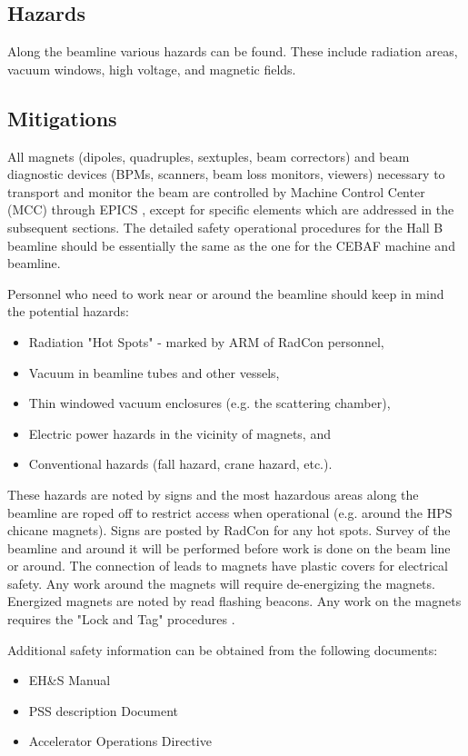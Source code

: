 \documentclass[11pt]{report}
\begin{document}
\subsection{Hazards} 

Along the beamline various hazards can be found. These include radiation areas, vacuum windows, high voltage, and magnetic fields.

\subsection{Mitigations}

\indent

All magnets (dipoles, quadruples, sextuples, beam correctors) and beam diagnostic devices (BPMs, scanners, beam loss monitors, viewers) necessary to transport and monitor the beam are controlled by Machine Control Center (MCC) through EPICS \cite{epics}, except for specific elements which are addressed in the subsequent sections. The detailed safety operational procedures for the Hall B beamline should be essentially the same as the one for the CEBAF machine and beamline.

Personnel who need to work near or around the beamline should keep in mind the potential hazards:
\begin{itemize}
\item Radiation "Hot Spots" - marked by ARM of RadCon personnel,
\item Vacuum in beamline tubes and other vessels,
\item Thin windowed vacuum enclosures (e.g. the scattering chamber),
\item Electric power hazards in the vicinity of magnets, and 
\item Conventional hazards (fall hazard, crane hazard, etc.). 
\end{itemize} 

These hazards are noted by signs and the most hazardous areas along the beamline are roped off to restrict access when operational (e.g. around the HPS chicane magnets). Signs are posted by RadCon for any hot spots. Survey of the beamline and around it will be performed before work is done on the beam line or around. The connection of leads to magnets have plastic covers for electrical safety. Any work around the magnets will require de-energizing the magnets. Energized magnets are noted by read flashing beacons. Any work on the magnets requires the "Lock and Tag" procedures \cite{ehs}.  

Additional safety information can be obtained from the following documents:
\begin{itemize}[label=$\circ$]

\item EH\&S Manual \cite{ehs} 

\item PSS description Document \cite{pss}

\item Accelerator Operations Directive \cite{ops}

\end{itemize} 
\end{document}
